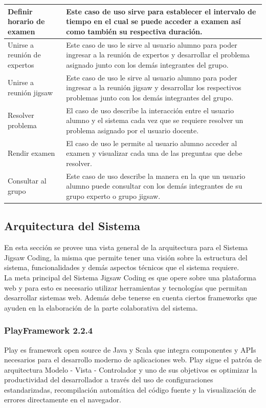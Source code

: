 \begin{longtable}{L{4cm}L{9cm}}
	\midrule
	Definir horario de examen & Este caso de uso sirve para establecer el intervalo de tiempo en el cual se puede acceder a examen así como también su respectiva duración.\\
	\midrule
	Unirse a reunión de expertos & Este caso de uso le sirve al usuario alumno para poder ingresar a la reunión de expertos y desarrollar el problema asignado junto con los demás integrantes del grupo.\\
	\midrule
	Unirse a reunión jigsaw & Este caso de uso le sirve al usuario alumno para poder ingresar a la reunión jigsaw y desarrollar los respectivos problemas junto con los demás integrantes del grupo. \\
	\midrule
	Resolver problema & El caso de uso describe la interacción entre el usuario alumno y el sistema cada vez que se requiere resolver un problema asignado por el usuario docente.\\
	\midrule
	Rendir examen & El caso de uso le permite al usuario alumno acceder al examen y visualizar cada una de las preguntas que debe resolver.\\
	\midrule
	Consultar al grupo & Este caso de uso describe la manera en la que un usuario alumno puede consultar con los demás integrantes de su grupo experto o grupo jigsaw.\\
	\bottomrule[0.8mm]
\end{longtable}

\subsection{Arquitectura del Sistema}
En esta sección se provee una vista general de la arquitectura para el Sistema Jigsaw Coding, la misma que permite tener una visión sobre la estructura del sistema, funcionalidades y demás aspectos técnicos que el sistema requiere.\\

La meta principal del Sistema Jigsaw Coding es que opere sobre una plataforma web y para esto es necesario utilizar herramientas y tecnologías que permitan desarrollar sistemas web. Además debe tenerse en cuenta ciertos frameworks que ayuden en la elaboración de la parte colaborativa del sistema.

\subsubsection{PlayFramework 2.2.4}
Play es framework open source de Java y Scala que integra componentes y APIs necesarios para el desarrollo moderno de aplicaciones web. Play sigue el patrón de arquitectura Modelo - Vista - Controlador y uno de sus objetivos es optimizar la productividad del desarrollador a través del uso de configuraciones estandarizadas, recompilación automática del código fuente y la visualización de errores directamente en el navegador.


